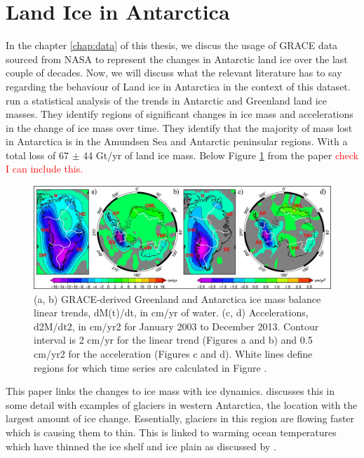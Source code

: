 \documentclass[../main.tex]{subfiles}
\begin{document}
\section{Land Ice in Antarctica}
In the chapter \ref{chap:data} of this thesis, we discus the usage of GRACE data sourced from NASA to represent the changes in Antarctic land ice over the last couple of decades. Now, we will discuss what the relevant literature has to say regarding the behaviour of Land ice in Antarctica in the context of this dataset. \cite{Velicogna2014RegionalData} run a statistical analysis of the trends in Antarctic and Greenland land ice masses. They identify regions of significant changes in ice mass and accelerations in the change of ice mass over time. They identify that the majority of mass lost in Antarctica is in the Amundsen Sea and Antarctic peninsular regions. With a total loss of 67 $\pm$ 44 Gt/yr of land ice mass. Below Figure \ref{fig:ice_mass_from_paper} from the paper \textcolor{red}{check I can include this.}
\begin{figure}[hbt!]
    \centering
    \includegraphics[width=\textwidth]{images/from_papers/grl52143-fig-0001-m.jpg}
    \caption{(a, b) GRACE‐derived Greenland and Antarctica ice mass balance linear trends, dM(t)/dt, in cm/yr of water. (c, d) Accelerations, d2M/dt2, in cm/yr2 for January 2003 to December 2013. Contour interval is 2 cm/yr for the linear trend (Figures a and b) and 0.5 cm/yr2 for the acceleration (Figures c and d). White lines define regions for which time series are calculated in Figure .}
    \label{fig:ice_mass_from_paper}
\end{figure}

This paper links the changes to ice mass with ice dynamics. \cite{Flament2020DynamicAltimetry} discusses this in some detail with examples of glaciers in western Antarctica, the location with the largest amount of ice change. Essentially, glaciers in this region are flowing faster which is causing them to thin. This is linked to warming ocean temperatures which have thinned the ice shelf and ice plain as discussed by \cite{corr_doake_jenkins_vaughan_2001}.
\end{document}
